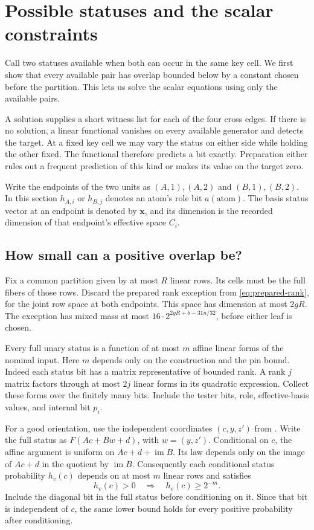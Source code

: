 \section{Possible statuses and the scalar constraints}
\label{sec:status-span}

Call two statuses available when both can occur in the same key cell.
We first show that every available pair has overlap bounded below by a
constant chosen before the partition. This lets us solve the scalar
equations using only the available pairs.

A solution supplies a short witness list for each of the four cross
edges. If there is no solution, a linear functional vanishes on every
available generator and detects the target. At a fixed key cell we may
vary the status on either side while holding the other fixed. The
functional therefore predicts a bit exactly. Preparation either rules
out a frequent prediction of this kind or makes its value on the target
zero.

Write the endpoints of the two units as $(A,1),(A,2)$ and
$(B,1),(B,2)$. In this section $h_{A,i}$ or $h_{B,j}$ denotes an atom's
role bit $a(\mathrm{atom})$. The basis status
vector at an endpoint is denoted by $\mathbf x$, and its dimension is
the recorded dimension of that endpoint's effective space $C_i$.

\subsection{How small can a positive overlap be?}

Fix a common partition given by at most \(R\) linear rows. Its cells
must be the full fibers of those rows. Discard the prepared rank exception
from \eqref{eq:prepared-rank}, for the joint row space at both endpoints.
This space has dimension at most \(2gR\). The exception has mixed mass
at most \(16\cdot2^{2gR+b-31n/32}\), before either leaf is chosen.

Every full unary status is a function of at most \(m\) affine linear
forms of the nominal input. Here \(m\) depends only on the construction
and the pin bound. Indeed each status bit has a matrix representative
of bounded rank. A rank \(j\) matrix factors through at most \(2j\)
linear forms in its quadratic expression. Collect these forms over the
finitely many bits. Include the tester bits, role, effective-basis values, and
internal bit \(p_i\).

For a good orientation, use the independent coordinates \((c,y,z')\)
from . Write the full status as
\(F(Ac+Bw+d)\), with \(w=(y,z')\). Conditional on \(c\), the affine
argument is uniform on \(Ac+d+\operatorname{im}B\). Its law depends
only on the image of \(Ac+d\) in the quotient by \(\operatorname{im}B\).
Consequently each conditional status probability \(h_v(c)\) depends
on at most \(m\) linear rows and satisfies
\[
 h_v(c)>0\quad\Longrightarrow\quad h_v(c)\ge2^{-m}.
\]
Include the diagonal bit in the full status before conditioning on it.
Since that bit is independent of \(c\), the same lower bound holds
for every positive probability after conditioning.

